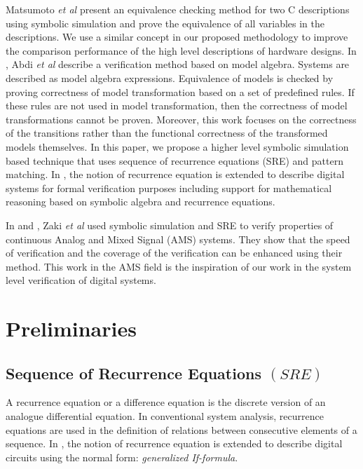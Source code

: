 \documentclass[submission,copyright,creativecommons]{eptcs}
\begin{document}
Matsumoto \emph{et al} \cite{4} present an equivalence checking method for two C descriptions using symbolic simulation and prove the equivalence of all variables in the descriptions. We use a similar concept in our proposed methodology to improve the comparison performance of the high level descriptions of hardware designs. In \cite{22}, Abdi \emph{et al} describe a verification method based on model algebra. Systems are described as model algebra expressions. Equivalence of models is checked by proving correctness of model transformation based on a set of predefined rules. If these rules are not used in model transformation, then the correctness of model transformations cannot be proven. Moreover, this work focuses on the correctness of the transitions rather than the functional correctness of the transformed models themselves. In this paper, we propose a higher level symbolic simulation based technique that uses sequence of recurrence equations (SRE) and pattern matching. In \cite{1}, the notion of recurrence equation is extended to describe digital systems for formal verification purposes including support for mathematical reasoning based on symbolic algebra and recurrence equations.

In \cite{33} and \cite{34}, Zaki \emph{et al} used symbolic simulation and SRE to verify properties of continuous Analog and Mixed Signal (AMS) systems. They show that the speed of verification and the coverage of the verification can be enhanced using their method. This work in the AMS field is the inspiration of our work in the system level verification of digital systems.

\section{Preliminaries}
\subsection{Sequence of Recurrence Equations $(SRE)$ }
A recurrence equation or a difference equation is the discrete version of an analogue differential equation. In conventional system analysis, recurrence equations are used in the definition of relations between consecutive elements of a sequence. In \cite{1}, the notion of recurrence equation is extended to describe digital circuits using the normal form: \emph{generalized If-formula}.\\
\end{document}
